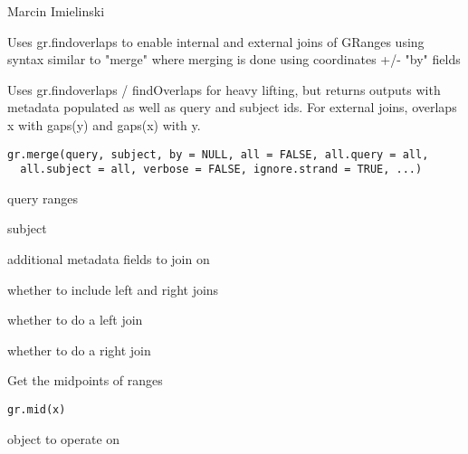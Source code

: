 \documentclass[a4paper]{book}
\begin{document}
%
\begin{Author}\relax
Marcin Imielinski
\end{Author}
%
\begin{Description}\relax
Uses gr.findoverlaps to enable internal and external joins of GRanges using
syntax similar to "merge" where merging is done using coordinates +/- "by" fields

Uses gr.findoverlaps / findOverlaps for heavy lifting, but returns outputs with
metadata populated as well as query and subject ids.  For external joins,
overlaps x with gaps(y) and gaps(x) with y.
\end{Description}
%
\begin{Usage}
\begin{verbatim}
gr.merge(query, subject, by = NULL, all = FALSE, all.query = all,
  all.subject = all, verbose = FALSE, ignore.strand = TRUE, ...)
\end{verbatim}
\end{Usage}
%
\begin{Arguments}
\begin{ldescription}
\item[\code{query}] query ranges

\item[\code{subject}] subject

\item[\code{by}] additional metadata fields to join on

\item[\code{all}] whether to include left and right joins

\item[\code{all.query}] whether to do a left join

\item[\code{all.subject}] whether to do a right join
\end{ldescription}
\end{Arguments}
%
\begin{Description}\relax
Get the midpoints of  ranges
\end{Description}
%
\begin{Usage}
\begin{verbatim}
gr.mid(x)
\end{verbatim}
\end{Usage}
%
\begin{Arguments}
\begin{ldescription}
\item[\code{x}]  object to operate on
\end{ldescription}
\end{Arguments}
\end{document}
